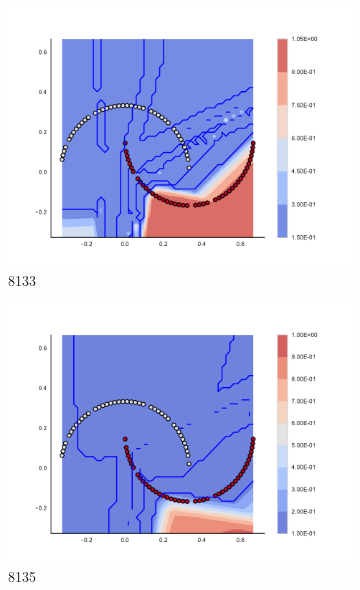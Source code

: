 \begin{figure}[h]
\begin{subfigure}[b]{0.09\textwidth}
    \includegraphics[clip, trim=2.35cm 1.75cm 4.5cm 0cm,width=\textwidth]{img/convergence/8133.pdf}
    \caption{8133}
    \label{fig:convergence_8133}
\end{subfigure}
%
\begin{subfigure}[b]{0.09\textwidth}
    \includegraphics[clip, trim=2.35cm 1.75cm 4.5cm 0cm,width=\textwidth]{img/convergence/8135.pdf}
    \caption{8135}
    \label{fig:convergence_8135}
\end{subfigure}
%
\begin{subfigure}[b]{0.09\textwidth}

\end{subfigure}
\end{figure}
